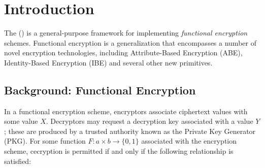 \chapter{Introduction}

The {\libraryname} ({\libraryshort}) is a general-purpose framework for implementing {\em functional encryption} schemes.  Functional encryption is a generalization that encompasses a number of novel encryption technologies, including Attribute-Based Encryption (ABE), Identity-Based Encryption (IBE) and several other new primitives.  

\section{Background: Functional Encryption}




In a functional encryption scheme, encryptors associate ciphertext values with some value $X$.  Decryptors may request a decryption key associated with a value $Y$; these are produced by a trusted authority known as the Private Key Generator (PKG).  For some function $F: a \times b \rightarrow \{0,1\}$ associated with the encryption scheme, cecryption is permitted if and only if the following relationship is satisfied:  

